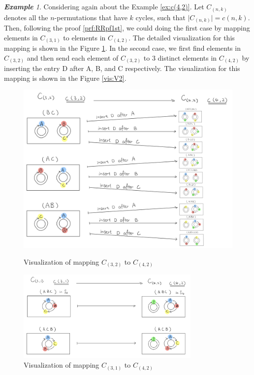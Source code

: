 \documentclass{article}
\theoremstyle{definition}
\theoremstyle{remark}
\theoremstyle{example}
\newtheorem{example}{\textbf{Example}}[section]
\begin{document}
\begin{example}
    Considering again about the Example \ref{ex:c(4,2)}. Let $C_{(n,k)}$ denotes all the $n$-permutations that have $k$ cycles, such that $\lvert C_{(n,k)}\rvert = c(n,k)$. Then, following the proof \ref{prf:RRpf1st}, we could doing the first case by mapping elements in $C_{(3,1)}$ to elements in $C_{(4,2)}$. The detailed visualization for this mapping is shown in the Figure \ref{vis:V3}. In the second case, we first find elements in $C_{(3,2)}$ and then send each element of $C_{(3,2)}$ to $3$ distinct elements in $C_{(4,2)}$ by inserting the entry D after A, B, and C respectively. The visualization for this mapping is shown in the Figure \ref{vis:V2}.
    
    
    \begin{figure}[H]
        \centering
        \begin{minipage}{.5\textwidth}
            \centering
            \includegraphics[width=1\textwidth]{Visualization2.jpeg}
            \caption{\label{vis:V2}Visualization of mapping $C_{(3,2)}$ to $C_{(4,2)}$}
        \end{minipage}%
        \begin{minipage}{.5\textwidth}
            \centering
            \includegraphics[width=0.8\textwidth]{Visualization3.jpeg}
            \caption{\label{vis:V3}Visualization of mapping $C_{(3,1)}$ to $C_{(4,2)}$}
        \end{minipage}
    \end{figure}
\end{example}
\end{document}
